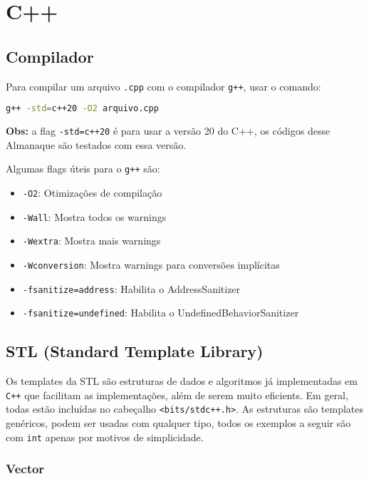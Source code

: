 \chapter{C++}

\section{Compilador}

Para compilar um arquivo \texttt{.cpp} com o compilador \texttt{g++}, usar o comando:

\begin{lstlisting}[language=bash]
    g++ -std=c++20 -O2 arquivo.cpp
\end{lstlisting}

\textbf{Obs:} a flag \texttt{-std=c++20} é para usar a versão 20 do C++, os códigos desse Almanaque são testados com essa versão.

Algumas flags úteis para o \texttt{g++} são:

\begin{itemize}
    \item \texttt{-O2}: Otimizações de compilação
    \item \texttt{-Wall}: Mostra todos os warnings
    \item \texttt{-Wextra}: Mostra mais warnings
    \item \texttt{-Wconversion}: Mostra warnings para conversões implícitas
    \item \texttt{-fsanitize=address}: Habilita o AddressSanitizer
    \item \texttt{-fsanitize=undefined}: Habilita o UndefinedBehaviorSanitizer
\end{itemize}

\section{STL (Standard Template Library)}

Os templates da STL são estruturas de dados e algoritmos já implementadas em \texttt{C++} que facilitam as implementações, além de serem muito eficients.
Em geral, todas estão incluídas no cabeçalho \texttt{<bits/stdc++.h>}. As estruturas são templates genéricos, podem ser usadas com qualquer tipo, todos os exemplos a seguir são com \texttt{int} apenas por motivos de simplicidade.

\subsection{Vector}


